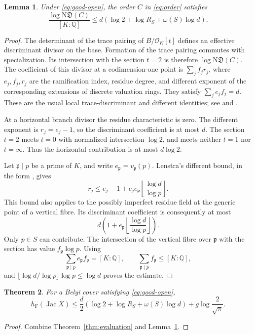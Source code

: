\documentclass[11pt,a4paper]{article}
\newtheorem{theorem}{Theorem}[section]
\newtheorem{lemma}[theorem]{Lemma}
\theoremstyle{definition}
\newcommand{\Q}{\mathbb Q}
\newcommand{\hF}{h_{\mathrm F}}
\newcommand{\OK}{\mathcal O_K}
\newcommand{\Jac}{\operatorname{Jac}}
\begin{document}
\begin{lemma}\label{lem:discriminant}
Under \eqref{eq:good-open}, the order $C$ in \eqref{eq:order}
satisfies
\[
 \frac{\log\mathrm N\mathfrak D(C)}{[K:\Q]}
 \le d\left(\log2+\log R_S+\omega(S)\log d\right).
\]
\end{lemma}
\begin{proof}
The determinant of the trace pairing of $B/\OK[t]$ defines an
effective discriminant divisor on the base. Formation of the trace
pairing commutes with specialization. Its intersection with the
section $t=2$ is therefore $\log\mathrm N\mathfrak D(C)$.
The coefficient of this divisor at a codimension-one point is
$\sum_j f_jr_j$, where $e_j,f_j,r_j$ are the ramification index,
residue degree, and different exponent of the corresponding
extensions of discrete valuation rings. They satisfy
$\sum_j e_jf_j=d$. These are the usual local
trace-discriminant and different identities; see
\cite[Chapter~III, Sections~3 and~6]{Serre} and
\cite[Section~4.2]{Javanpeykar}.

At a horizontal branch divisor the residue characteristic is zero.
The different exponent is $r_j=e_j-1$, so the discriminant
coefficient is at most $d$. The section $t=2$ meets $t=0$
with normalized intersection $\log2$, and meets neither $t=1$
nor $t=\infty$. Thus the horizontal contribution is at most
$d\log2$.

Let $\mathfrak p\mid p$ be a prime of $K$, and write
$e_{\mathfrak p}=v_{\mathfrak p}(p)$.
Lenstra's different bound, in the form
\cite[Proposition~4.1.3]{Javanpeykar}, gives
\[
 r_j\le e_j-1+e_j e_{\mathfrak p}
                \left\lfloor\frac{\log d}{\log p}\right\rfloor.
\]
This bound also applies to the possibly imperfect residue field
at the generic point of a vertical fibre.
Its discriminant coefficient is consequently at most
\[
 d\left(1+e_{\mathfrak p}
                \left\lfloor\frac{\log d}{\log p}\right\rfloor\right).
\]
Only $p\in S$ can contribute. The intersection of the vertical
fibre over $\mathfrak p$ with the section has value
$f_{\mathfrak p}\log p$. Using
\[
 \sum_{\mathfrak p\mid p}e_{\mathfrak p}f_{\mathfrak p}=[K:\Q],
 \qquad \sum_{\mathfrak p\mid p}f_{\mathfrak p}\le[K:\Q],
\]
and
$\lfloor\log d/\log p\rfloor\log p\le\log d$
proves the estimate.
\end{proof}

\begin{theorem}\label{thm:coverheight}
For a Belyi cover satisfying \eqref{eq:good-open},
\begin{equation}\label{eq:coverheight}
 \hF(\Jac X)
 \le\frac d2\left(\log2+\log R_S+\omega(S)\log d\right)
       +g\log\frac2{\sqrt\pi}.
\end{equation}
\end{theorem}
\begin{proof}
Combine Theorem~\ref{thm:evaluation} and
Lemma~\ref{lem:discriminant}.
\end{proof}
\end{document}
